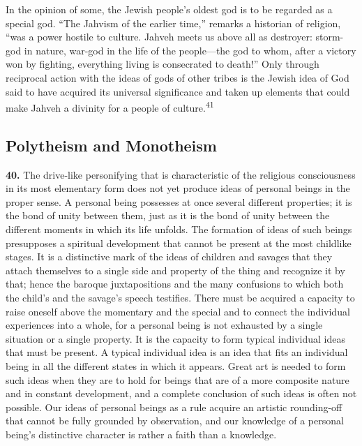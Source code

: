 \documentclass[12pt,a4paper]{book}
\newcommand{\opage}[1]{\marginnote{\footnotesize\textit{[#1]}}}
\begin{document}
In the opinion of some, the Jewish people's oldest god is to be regarded as a special god.
``The Jahvism of the earlier time,'' remarks a historian of religion, ``was a power hostile
to culture. Jahveh meets us above all as destroyer: storm-god in nature, war-god in the life
of the people---the god to whom, after a victory won by fighting, everything living is
consecrated to death!'' Only through reciprocal action with the ideas of gods of other
tribes is the Jewish idea of God said to have acquired its universal significance and taken
up elements that could make Jahveh a divinity for a people of culture.\textsuperscript{41}

\subsection{Polytheism and Monotheism}
\label{ssec:polytheism}

\noindent\textbf{40.} The drive-like personifying that is characteristic of the
religious consciousness in its most elementary form does not yet produce ideas of
personal beings in the proper sense. A personal being possesses at once several
different properties; it is the bond of unity between them, just as it is the bond
of unity between the different moments in which its life unfolds. The formation of
ideas of 
\opage{93}such beings presupposes a spiritual development that cannot be present at
the most childlike stages. It is a distinctive mark of the ideas of children and
savages that they attach themselves to a single side and property of the thing and
recognize it by that; hence the baroque juxtapositions and the many confusions to
which both the child's and the savage's speech testifies. There must be acquired a
capacity to raise oneself above the momentary and the special and to connect the
individual experiences into a whole, for a personal being is not exhausted by a
single situation or a single property. It is the capacity to form typical individual
ideas that must be present. A typical individual idea is an idea that fits an
individual being in all the different states in which it appears. Great art is
needed to form such ideas when they are to hold for beings that are of a more
composite nature and in constant development, and a complete conclusion of such
ideas is often not possible. Our ideas of personal beings as a rule acquire an
artistic rounding-off that cannot be fully grounded by observation, and our knowledge
of a personal being's distinctive character is rather a faith than a knowledge.
\end{document}
